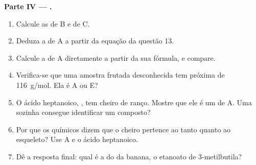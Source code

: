 \begin{problem}
\medskip
\noindent\textbf{Parte IV --- .}
\begin{enumerate}[resume]
  \item Calcule as  de B e de C.
  \item Deduza a  de A a partir da equação da questão 13.
  \item Calcule a  de A diretamente a partir da sua fórmula,
        e compare.
  \item Verifica-se que uma amostra frutada desconhecida tem 
        próxima de \qty{116}{g/mol}. Ela é A ou E?
  \item O ácido heptanoico, , tem cheiro de ranço.
        Mostre que ele é um  de A. Uma  sozinha
        consegue identificar um composto?
  \item Por que os químicos dizem que o cheiro pertence ao  tanto quanto ao esqueleto? Use A e o ácido heptanoico.
  \item Dê a resposta final: qual é a  do  da banana, o
        etanoato de 3-metilbutila?
\end{enumerate}
\end{problem}
